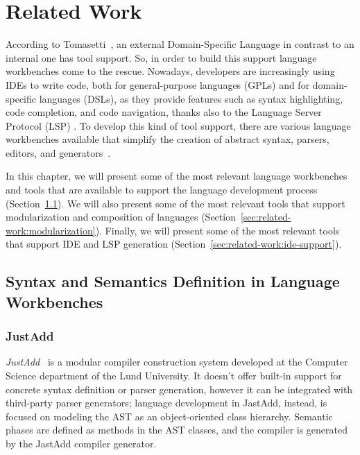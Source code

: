 \chapter{Related Work}\label{chap:related-work:RelatedWork}

According to Tomasetti~\cite{tomassetti_complete_2017}, an external Domain-Specific Language in contrast to an internal one has tool support. So, in order to build this support language workbenches come to the rescue.
Nowadays, developers are increasingly using IDEs to write code, both for general-purpose languages (GPLs) and for domain-specific languages (DSLs), as they provide features such as syntax highlighting, code completion, and code navigation, thanks also to the Language Server Protocol (LSP) \cite{Rodriguez-Echeverria18a}.
To develop this kind of tool support, there are various language workbenches available that simplify the creation of abstract syntax, parsers, editors, and generators~\cite{Fowler05}.

In this chapter, we will present some of the most relevant language workbenches and tools that are available to support the language development process (Section~\ref{sec:related-work:syntax-semantics}). We will also present some of the most relevant tools that support modularization and composition of languages (Section~\ref{sec:related-work:modularization}). Finally, we will present some of the most relevant tools that support IDE and LSP generation (Section~\ref{sec:related-work:ide-support}).

\section{Syntax and Semantics Definition in Language Workbenches}\label{sec:related-work:syntax-semantics}

\subsection{JustAdd}\label{subsec:related-work:justadd}

\textit{JustAdd}~\cite{Ekman07b} is a modular compiler construction system developed at the Computer Science department of the Lund University.
It doesn’t offer built-in support for concrete syntax definition or parser generation, however it can be integrated with third-party parser generators; language development in JastAdd, instead, is focused on modeling the AST as an object-oriented class hierarchy. Semantic phases are defined as methods in the AST classes, and the compiler is generated by the JastAdd compiler generator.

